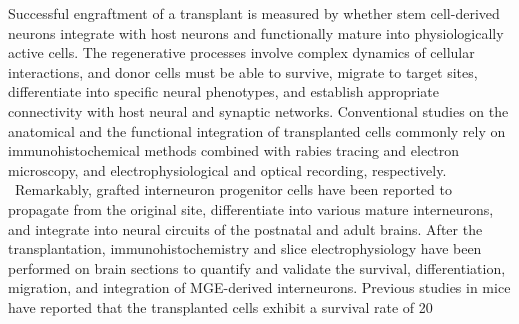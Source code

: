 Successful  engraftment of a transplant is measured by whether stem cell-derived neurons  integrate with host neurons and functionally mature into physiologically active  cells. The regenerative processes involve complex dynamics of cellular  interactions, and donor cells must be able to survive, migrate to target sites,  differentiate into specific neural phenotypes, and establish appropriate  connectivity with host neural and synaptic networks. Conventional studies on  the anatomical and the functional integration of transplanted cells commonly  rely on immunohistochemical methods combined with rabies tracing and electron  microscopy, and electrophysiological and optical recording, respectively.  Remarkably,  grafted interneuron progenitor cells have been reported to propagate from the  original site, differentiate into various mature interneurons, and integrate  into neural circuits of the postnatal and adult brains. After the  transplantation, immunohistochemistry and slice electrophysiology have been  performed on brain sections to quantify and validate the survival,  differentiation, migration, and integration of MGE-derived interneurons.  Previous studies in mice have reported that the transplanted cells exhibit a  survival rate of 20 %




